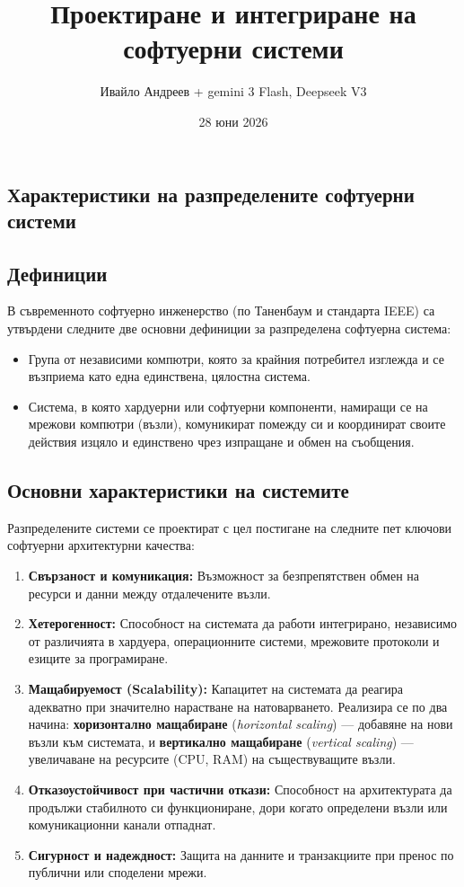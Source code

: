 \documentclass{scrartcl}
\title{Проектиране и интегриране на софтуерни системи}
\author{Ивайло Андреев + gemini 3 Flash, Deepseek V3}
\date{28 юни 2026}
\begin{document}
\maketitle

\tableofcontents

\newpage

\begin{FlushLeft}

\section{Характеристики на разпределените софтуерни системи}

\subsection{Дефиниции}
В съвременното софтуерно инженерство (по Таненбаум и стандарта IEEE) са утвърдени следните две основни дефиниции за разпределена софтуерна система:
\begin{itemize}
    \item Група от независими компютри, която за крайния потребител изглежда и се възприема като една единствена, цялостна система.
    \item Система, в която хардуерни или софтуерни компоненти, намиращи се на мрежови компютри (възли), комуникират помежду си и координират своите действия изцяло и единствено чрез изпращане и обмен на съобщения.
\end{itemize}

\subsection{Основни характеристики на системите}
Разпределените системи се проектират с цел постигане на следните пет ключови софтуерни архитектурни качества:
\begin{enumerate}
    \item \textbf{Свързаност и комуникация:} Възможност за безпрепятствен обмен на ресурси и данни между отдалечените възли.
    \item \textbf{Хетерогенност:} Способност на системата да работи интегрирано, независимо от различията в хардуера, операционните системи, мрежовите протоколи и езиците за програмиране.
    \item \textbf{Мащабируемост (Scalability):} Капацитет на системата да реагира адекватно при значително нарастване на натоварването. Реализира се по два начина: \textbf{хоризонтално мащабиране} (\textit{horizontal scaling}) — добавяне на нови възли към системата, и \textbf{вертикално мащабиране} (\textit{vertical scaling}) — увеличаване на ресурсите (CPU, RAM) на съществуващите възли.
    \item \textbf{Отказоустойчивост при частични откази:} Способност на архитектурата да продължи стабилното си функциониране, дори когато определени възли или комуникационни канали отпаднат.
    \item \textbf{Сигурност и надеждност:} Защита на данните и транзакциите при пренос по публични или споделени мрежи.
\end{enumerate}


\end{FlushLeft}
\end{document}
